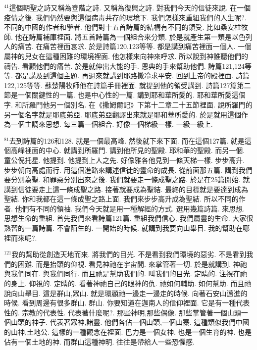 \documentclass{book}
\begin{document}
$^{41}$這個朝聖之詩又稱為登階之詩.
又稱為復興之詩.
對我們今天的信徒來說.
在一個疫情之後.
我們仍然要與這個病毒共存的環境下.
我們怎樣來重組我們的人生呢?.
不同的中國的作者和學者.
他們對十五首詩篇的結構有不同的領受.
比如桑安柱牧師.
他在詩篇補庫裡面.
將五首詩篇為一個組合來分類.
於是就產生第一類是以色列人的痛苦.
在痛苦裡面哀求.
於是詩篇120,123等等.
都是講到痛苦裡面一個人.
一個屬神的兒女在這種困難的環境裡面.
他怎樣來向神來呼求.
所以說到神誰聽他們的禱告.
看顧他們的痛苦.
於是就伸出大能的手.
恩典的手來幫助他們.
詩篇121,124等等.
都是講及到這個主題.
再過來就講到耶路撒冷求平安.
回到上帝的殿裡面.
詩篇122,125等等.
蘇楚陽牧師他在詩篇手冊裡面.
就提到他的領受講到.
詩篇127篇第二節是一個關鍵性的一篇.
也是中心性的一篇.
講到耶和華所愛的.
耶和華所愛這個字.
和所羅門他另一個別名.
在《撒姆爾記》下第十二章二十五節裡面.
說所羅門的另一個名字就是耶底弟亞.
耶底弟亞翻譯出來就是耶和華所愛的.
於是就用這個作為一個主調來思想.
每三篇一個組合.
好像一個梯級一樣.
一級一級上.

$^{81}$去到詩篇的126和128.
就是一個最高峰.
然後就下來下面.
而在這個127篇.
就是這個高峰裡面的中心.
就講到所羅門.
講到他所見的聖殿.
耶和華的聖殿.
而另一個.
童公倪托星.
他提到.
他提到上人之先.
好像雅各他見到一條天梯一樣.
步步高升.
步步朝向高處而行.
用這個進路來講述信徒的靈命的成長.
從前面那五篇.
講到我們要分別為聖.
和罪惡分別出來之後.
我們就要走一條成聖之路.
於是在25篇開始.
就講到信徒要走上這一條成聖之路.
接著就要成為聖結.
最終的目標就是要達到成為聖結.
你和我都在這一條成聖之路上面.
我們來步步高升成為聖結.
所以不同的作者.
他們有不同的領袖.
我們今天就是用一種解經的方式.
選用幾篇詩篇.
來思想.
思想生命的重組.
首先我們來看詩篇121篇.
重組我們信心.
我們屬靈的生命.
大家很熟習的一篇詩篇.
不會陌生的.
一開始的時候.
就講到我要向山舉目.
我的幫助在哪裡而來呢?.

$^{121}$我的幫助從創造天地而來.
將我們的目光.
不是看到我們環境的惡劣.
不是看到我們的困難.
而是抬頭的仰視.
看見神祂在宇宙間.
來掌管著一切.
於是就講到.
神祂與我們同在.
與我們同行.
而且祂是幫助我們的.
叫我們的目光.
定睛的.
注視在祂的身上.
仰視的.
定睛的.
看著神祂自己的眼神的仇.
祂如何輔助.
如何幫助.
而且祂說向山舉目.
這是群山,眾山.
就是環顧祂一邊走一邊走的時候.
向著石安山邁進的時候.
看到周邊有很多群山.
群山.
你要知道在迦南人的信仰裡面.
它是有一種代表性的.
宗教的代表性.
代表著什麼呢?.
那些神明,那些偶像.
那些掌管著一個山頭一個山頭的神子.
代表著眾神,諸靈.
他們各佔一個山頭,一個山寨.
這種類似我們中國的山神,土地公.
這樣的一種觀念在裡面.
巴力是一個女神.
也是一個生育的神.
也是佔有一個土地的神.
而群山這種神明.
往往是帶給人一些恐懼感.
\end{document}
